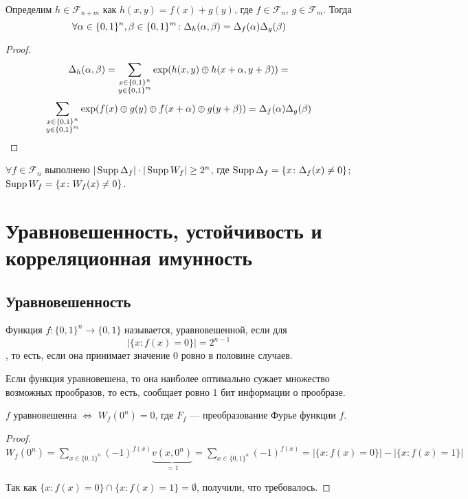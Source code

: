 \begin{theorem}
Определим $h \in \mathscr{F}_{n+m}$ как $h(x,y) = f(x) + g(y)$, где
$f \in \mathscr{F}_n,\, g \in \mathscr{F}_m$. Тогда
   $$\forall \alpha \in \{0,1\}^n, \beta \in \{0,1\}^m\colon 
                  \Delta_h(\alpha, \beta) = \Delta_f(\alpha) \Delta_g(\beta)$$
\end{theorem}

\begin{proof}
$$\Delta_h (\alpha, \beta) = 
\sum\limits_{\substack{x \in \{0,1\}^n \\ y \in \{0,1\}^m}} 
\exp( h(x,y) \oplus h(x+\alpha, y+\beta)) = $$ 
$$\sum\limits_{\substack{x \in \{0,1\}^n \\ y \in \{0,1\}^m}}
\exp(f(x) \oplus g(y) \oplus f(x + \alpha) \oplus g(y + \beta)) 
= \Delta_f(\alpha) \Delta_g(\beta)$$
\end{proof}

\begin{corollary}
$\forall f \in \mathscr{F}_n$ выполнено $|\operatorname*{Supp} \Delta_f| \cdot |\operatorname*{Supp} W_f| \ge 2^n$,
где $\operatorname*{Supp} \Delta_f = \{x \colon \Delta_f (x) \neq 0\}$;
    $\operatorname*{Supp} W_f = \{x \colon W_f (x) \neq 0\}$.
\end{corollary}

\section{Уравновешенность, устойчивость и корреляционная имунность}

\subsection{Уравновешенность}
\begin{definition}
Функция $f: \{0,1\}^n \to \{0,1\}$ называется, уравновешенной, если для 
  $$|\{x \colon f(x) = 0\}| = 2^{n-1}$$,
то есть, если она принимает значение $0$ ровно в половине случаев.
\end{definition}

Если функция уравновешена, то она наиболее оптимально сужает множество 
возможных прообразов, то есть, сообщает ровно 1 бит информации о прообразе.

\begin{proposition}
\label{eqweight_WH}
$f$ уравновешенна $\iff$ $W_f (0^n) = 0$, где $F_f$ --- преобразование Фурье функции $f$.
\end{proposition}

\begin{proof}
$W_f (0^n) = \sum\limits_{x \in \{0,1\}^n} (-1)^{f(x)} \underbrace{v(x,0^n)}_{ = 1} 
= \sum\limits_{x \in \{0,1\}^n} (-1)^{f(x)} 
= |\{x \colon f(x) = 0\}| - |\{x \colon f(x) = 1\}|$

Так как $\{x \colon f(x) = 0\}\cap \{x \colon f(x) = 1\} = \emptyset$,
 получили, что требовалось.
\end{proof}


